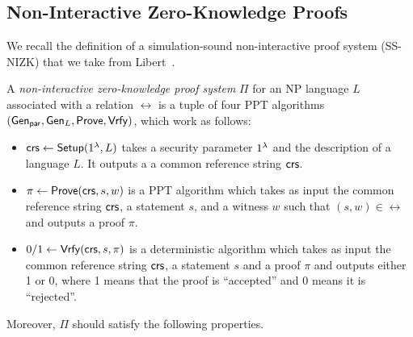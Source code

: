 
\subsection{Non-Interactive Zero-Knowledge Proofs}
We recall the definition of a simulation-sound non-interactive proof system (SS-NIZK) that we take from Libert~\etal \cite{Libert2021OneShotFN}. 

\begin{definition} 
A \emph{non-interactive zero-knowledge proof system} $\Pi$ for an NP language $L$ associated with a relation $\rel$ is a tuple of four PPT algorithms $(\mathsf{Gen}_{\mathsf{par}}, \mathsf{Gen}_L, \mathsf{Prove}, \mathsf{Vrfy})$, which work as follows:
\begin{itemize}
\item $\mathsf{crs} \leftarrow \mathsf{Setup}(1{^{\lambda}}, L)$ takes a security parameter $1{^{\lambda}}$ and the description of a language $L$.  It outputs a a common reference string $\mathsf{crs}$. 
\item $\pi \leftarrow \mathsf{Prove}(\mathsf{crs},s,w)$ is a PPT algorithm which takes as input the common reference string $\mathsf{crs}$, a statement $s$, and a witness $w$ such that $(s,w) \in \rel$ and outputs a proof $\pi$.
\item $0/1 \leftarrow \mathsf{Vrfy}(\mathsf{crs}, s, \pi)$ is a deterministic algorithm which takes as input the common reference string $\mathsf{crs}$, a statement $s$ and a proof $\pi$ and outputs either 1 or 0, where 1 means that the proof is ``accepted'' and 0 means it is ``rejected''.
\end{itemize}
Moreover, $\Pi$ should satisfy the following properties. 

\end{definition}
